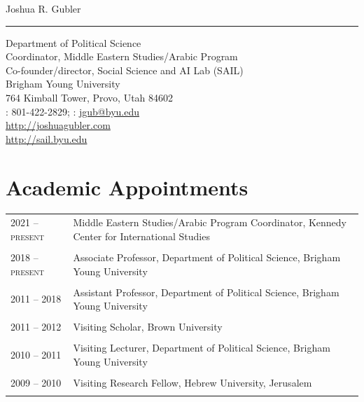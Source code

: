 \documentclass[10pt]{article}
\begin{document}
\color{text1}			 %


\par{\centering
{\Huge Joshua R. Gubler}	
\\[8pt]\par}
{\color{white} \hrule} %
	
\begin{center}
Department of Political Science\\
Coordinator, Middle Eastern Studies/Arabic Program\\
Co-founder/director, Social Science and AI Lab (SAIL)\\
Brigham Young University \\
764 Kimball Tower, Provo, Utah 84602\\
\raisebox{-2pt}{\Phone}: 801-422-2829; {\large \raisebox{-3pt}\Envelope}: \href{mailto:jgub@byu.edu}{jgub@byu.edu}\\ 
\href{http://joshuagubler.com}{http://joshuagubler.com}\\ 
\href{http://sail.byu.edu}{http://sail.byu.edu}\\[20pt]
\end{center}






\section{Academic Appointments}
\begin{flushleft}
\begin{tabular}{l l}
2021 -- {\scshape present} & Middle Eastern Studies/Arabic Program Coordinator, Kennedy Center for International Studies\\
&\\
2018 -- {\scshape present} & Associate Professor, Department of Political Science, Brigham Young University\\
&\\
2011 -- 2018 & Assistant Professor, Department of Political Science, Brigham Young University\\
&\\
2011 -- 2012 & Visiting Scholar, Brown University\\
&\\
2010 -- 2011 & Visiting Lecturer, Department of Political Science, Brigham Young University\\
&\\
2009 -- 2010 & Visiting Research Fellow, Hebrew University, Jerusalem\\
&\\

\end{tabular}\\[18pt]
\end{flushleft}
\end{document}

